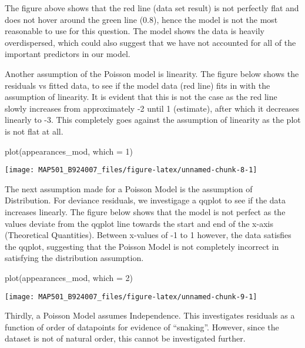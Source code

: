 \documentclass[
]{article}
\newenvironment{Shaded}{\begin{snugshade}}{\end{snugshade}}
\newcommand{\AttributeTok}[1]{\textcolor[rgb]{0.77,0.63,0.00}{#1}}
\newcommand{\DecValTok}[1]{\textcolor[rgb]{0.00,0.00,0.81}{#1}}
\newcommand{\FunctionTok}[1]{\textcolor[rgb]{0.00,0.00,0.00}{#1}}
\newcommand{\NormalTok}[1]{#1}
\begin{document}
The figure above shows that the red line (data set result) is not
perfectly flat and does not hover around the green line (0.8), hence the
model is not the most reasonable to use for this question. The model
shows the data is heavily overdispersed, which could also suggest that
we have not accounted for all of the important predictors in our model.

Another assumption of the Poisson model is linearity. The figure below
shows the residuals vs fitted data, to see if the model data (red line)
fits in with the assumption of linearity. It is evident that this is not
the case as the red line slowly increases from approximately -2 until 1
(estimate), after which it decreases linearly to -3. This completely
goes against the assumption of linearity as the plot is not flat at all.

\begin{Shaded}
\begin{Highlighting}[]
\FunctionTok{plot}\NormalTok{(appearances\_mod, }\AttributeTok{which =} \DecValTok{1}\NormalTok{)}
\end{Highlighting}
\end{Shaded}

\begin{center}\texttt{[image: MAP501\_B924007\_files/figure-latex/unnamed-chunk-8-1]} \end{center}

The next assumption made for a Poisson Model is the assumption of
Distribution. For deviance residuals, we investigage a qqplot to see if
the data increases linearly. The figure below shows that the model is
not perfect as the values deviate from the qqplot line towards the start
and end of the x-axis (Theoretical Quantities). Between x-values of -1
to 1 however, the data satisfies the qqplot, suggesting that the Poisson
Model is not completely incorrect in satisfying the distribution
assumption.

\begin{Shaded}
\begin{Highlighting}[]
\FunctionTok{plot}\NormalTok{(appearances\_mod, }\AttributeTok{which =} \DecValTok{2}\NormalTok{)}
\end{Highlighting}
\end{Shaded}

\begin{center}\texttt{[image: MAP501\_B924007\_files/figure-latex/unnamed-chunk-9-1]} \end{center}

Thirdly, a Poisson Model assumes Independence. This investigates
residuals as a function of order of datapoints for evidence of
``snaking''. However, since the dataset is not of natural order, this
cannot be investigated further.
\end{document}
